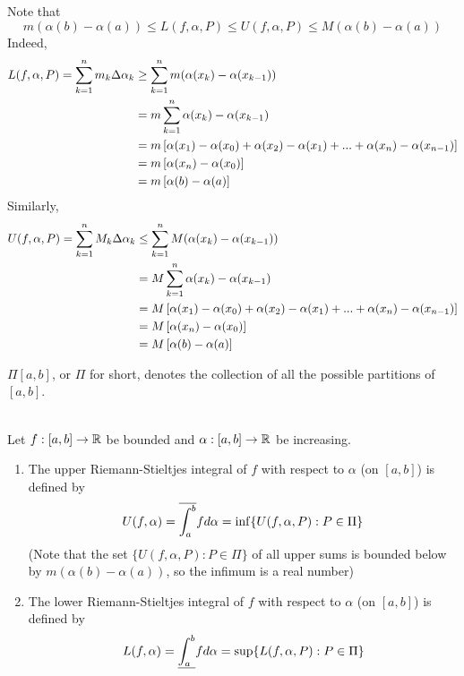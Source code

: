 \begin{note}
    Note that
    $$
    m(\alpha(b)-\alpha(a)) \leq L(f, \alpha, P) \leq U(f, \alpha, P) \leq M(\alpha(b) - \alpha(a))
    $$
    Indeed,
    \begin{align*}
        L(f, \alpha, P) = \sum_{k=1}^{n}m_k \Delta \alpha_{k} &\geq \sum_{k=1}^{n} m (\alpha(x_{k})-\alpha(x_{k-1})) \\
        &= m \sum_{k=1}^{n} \alpha(x_{k})-\alpha(x_{k-1}) \\
        &= m \left[\alpha(x_{1})-\alpha(x_{0}) + \alpha(x_{2})-\alpha(x_{1}) +... + \alpha(x_{n})-\alpha(x_{n-1})\right] \\
        &= m \left[\alpha(x_{n})-\alpha(x_{0})\right] \\ 
        &= m \left[\alpha(b) - \alpha(a)\right]
    \end{align*}
    Similarly,
    \begin{align*}
        U(f, \alpha, P) = \sum_{k=1}^{n}M_k \Delta \alpha_{k} &\leq \sum_{k=1}^{n} M (\alpha(x_{k})-\alpha(x_{k-1})) \\
        &= M \sum_{k=1}^{n} \alpha(x_{k})-\alpha(x_{k-1}) \\
        &= M \left[\alpha(x_{1})-\alpha(x_{0}) + \alpha(x_{2})-\alpha(x_{1}) +... + \alpha(x_{n})-\alpha(x_{n-1})\right] \\
        &= M \left[\alpha(x_{n})-\alpha(x_{0})\right] \\ 
        &= M \left[\alpha(b) - \alpha(a)\right]
    \end{align*}
\end{note}

\begin{notation}
    $\Pi [a,b]$, or $\Pi$ for short, denotes the collection of all the possible partitions of $[a,b]$.
\end{notation}

\begin{definition} \leavevmode\\
    Let $f:[a,b] \to \mathbb{R}$ be bounded and $\alpha : [a,b] \to \mathbb{R}$ be increasing.
    \begin{enumerate}[$(i)$]
        \item The upper Riemann-Stieltjes integral of $f$ with respect to $\alpha$ (on $[a,b]$) is defined by 
        $$
        U(f, \alpha) = \overline{\int_{a}^{b}}f d\alpha = \inf \{U(f, \alpha, P) : P \in \Pi \}
        $$
        (Note that the set $\{U(f, \alpha, P) : P \in \Pi\}$ of all upper sums is bounded below by $m(\alpha(b) - \alpha(a))$, so the infimum is a real number)
        
        \item The lower Riemann-Stieltjes integral of $f$ with respect to $\alpha$ (on $[a,b]$) is defined by 
        $$
        L(f, \alpha) = \underline{\int_{a}^{b}}f d\alpha = \sup \{L(f, \alpha, P) : P \in \Pi\}
        $$
    \end{enumerate}
\end{definition}

